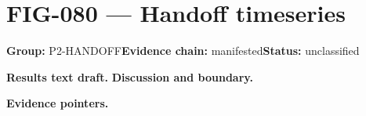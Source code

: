 \clearpage
\section{FIG-080 --- Handoff timeseries}
\label{figpage:fig-080}
\textbf{Group:} P2-HANDOFF\quad \textbf{Evidence chain:} manifested\quad \textbf{Status:} unclassified

\textbf{Results text draft.} 
\textbf{Discussion and boundary.} 


\textbf{Evidence pointers.}



\vfill
